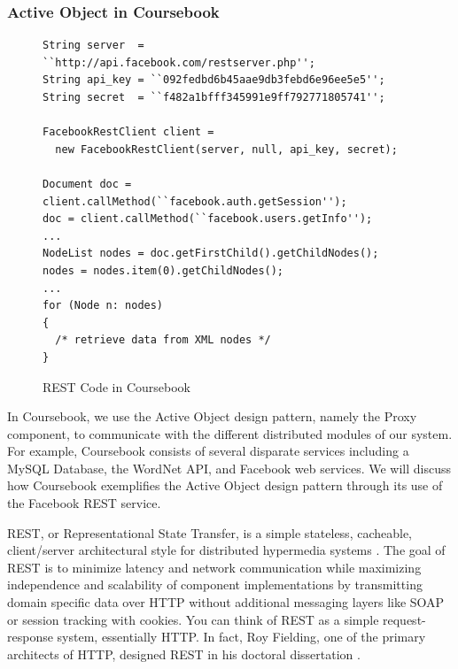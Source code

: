 \subsubsection{Active Object in Coursebook}

\begin{figure}[t]
\singlespacing
\makebox[\textwidth]{\hrulefill}
\begin{lstlisting}
String server  = ``http://api.facebook.com/restserver.php'';
String api_key = ``092fedbd6b45aae9db3febd6e96ee5e5'';
String secret  = ``f482a1bfff345991e9ff792771805741'';

FacebookRestClient client = 
  new FacebookRestClient(server, null, api_key, secret);

Document doc = client.callMethod(``facebook.auth.getSession'');
doc = client.callMethod(``facebook.users.getInfo'');
...
NodeList nodes = doc.getFirstChild().getChildNodes();
nodes = nodes.item(0).getChildNodes();
...
for (Node n: nodes)
{
  /* retrieve data from XML nodes */
}
\end{lstlisting}
\makebox[\textwidth]{\hrulefill}
\doublespacing
\caption{REST Code in Coursebook}
\label{fig:REST_code}
\end{figure}

In Coursebook, we use the Active Object design pattern, namely the Proxy 
component, to communicate with the different distributed modules of our system.
For example, Coursebook consists of several disparate services including a MySQL
Database, the WordNet API, and Facebook web services. We will discuss how
Coursebook exemplifies the Active Object design pattern through its use of the
Facebook REST service.

REST, or Representational State Transfer, is a simple stateless, cacheable,
client/server architectural style for distributed hypermedia systems 
\cite{Fielding00}. The goal of REST is to minimize latency and network
communication while maximizing independence and scalability of component 
implementations by transmitting domain specific data over HTTP without
additional messaging layers like SOAP or session tracking with cookies. You can
think of REST as a simple request-response system, essentially HTTP. In fact,
Roy Fielding, one of the primary architects of HTTP, designed REST in his
doctoral dissertation \cite{Fielding00}.

